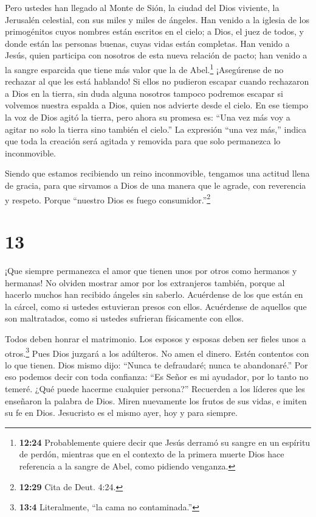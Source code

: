  Pero ustedes han llegado al Monte de Sión, la ciudad del
Dios viviente, la Jerusalén celestial, con sus miles y miles de ángeles.
 Han venido a la iglesia de los primogénitos cuyos nombres
están escritos en el cielo; a Dios, el juez de todos, y donde están las
personas buenas, cuyas vidas están completas.  Han venido a
Jesús, quien participa con nosotros de esta nueva relación de pacto; han
venido a la sangre esparcida que tiene más valor que la de
Abel.\footnote{\textbf{12:24} Probablemente quiere decir que Jesús
  derramó su sangre en un espíritu de perdón, mientras que en el
  contexto de la primera muerte Dios hace referencia a la sangre de
  Abel, como pidiendo venganza.}  ¡Asegúrense de no
rechazar al que les está hablando! Si ellos no pudieron escapar cuando
rechazaron a Dios en la tierra, sin duda alguna nosotros tampoco
podremos escapar si volvemos nuestra espalda a Dios, quien nos advierte
desde el cielo.  En ese tiempo la voz de Dios agitó la
tierra, pero ahora su promesa es: ``Una vez más voy a agitar no solo la
tierra sino también el cielo.''  La expresión ``una vez
más,'' indica que toda la creación será agitada y removida para que solo
permanezca lo inconmovible.

 Siendo que estamos recibiendo un reino inconmovible,
tengamos una actitud llena de gracia, para que sirvamos a Dios de una
manera que le agrade, con reverencia y respeto.  Porque
``nuestro Dios es fuego consumidor.''\footnote{\textbf{12:29} Cita de
  Deut. 4:24.}

\hypertarget{section-12}{%
\section{13}\label{section-12}}

 ¡Que siempre permanezca el amor que tienen unos por otros
como hermanos y hermanas!  No olviden mostrar amor por los
extranjeros también, porque al hacerlo muchos han recibido ángeles sin
saberlo.  Acuérdense de los que están en la cárcel, como si
ustedes estuvieran presos con ellos. Acuérdense de aquellos que son
maltratados, como si ustedes sufrieran físicamente con ellos.

 Todos deben honrar el matrimonio. Los esposos y esposas
deben ser fieles unos a otros.\footnote{\textbf{13:4} Literalmente, ``la
  cama no contaminada.''} Pues Dios juzgará a los adúlteros.
 No amen el dinero. Estén contentos con lo que tienen. Dios
mismo dijo: ``Nunca te defraudaré; nunca te abandonaré.'' 
Por eso podemos decir con toda confianza: ``Es Señor es mi ayudador, por
lo tanto no temeré. ¿Qué puede hacerme cualquier persona?'' 
Recuerden a los líderes que les enseñaron la palabra de Dios. Miren
nuevamente los frutos de sus vidas, e imiten su fe en Dios. 
Jesucristo es el mismo ayer, hoy y para siempre.

